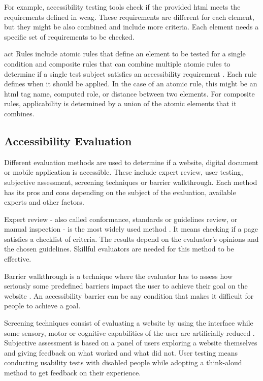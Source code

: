 \documentclass{master_thesis}
\begin{document}
For example, accessibility testing tools check if the provided \ac{html} meets the requirements defined in \ac{wcag}. These requirements are different for each element, but they might be also combined and include more criteria. Each element needs a specific set of requirements to be checked.

\ac{act} Rules include atomic rules that define an element to be tested for a single condition and composite rules that can combine multiple atomic rules to determine if a single test subject satisfies an accessibility requirement \citep{Fiers2019}. Each rule defines when it should be applied. In the case of an atomic rule, this might be an \ac{html} tag name, computed role, or distance between two elements. For composite rules, applicability is determined by a union of the atomic elements that it combines.

\subsection{Accessibility Evaluation}

Different evaluation methods are used to determine if a website, digital document or mobile application is accessible. These include expert review, user testing, subjective assessment, screening techniques or barrier walkthrough. Each method has its pros and cons depending on the subject of the evaluation, available experts and other factors.

Expert review - also called conformance, standards or guidelines review, or manual inspection - is the most widely used method \citep{Brajnik2008}. It means checking if a page satisfies a checklist of criteria. The results depend on the evaluator's opinions and the chosen guidelines. Skillful evaluators are needed for this method to be effective.

Barrier walkthrough is a technique where the evaluator has to assess how seriously some predefined barriers impact the user to achieve their goal on the website \citep{Brajnik2008}. An accessibility barrier can be any condition that makes it difficult for people to achieve a goal.

Screening techniques consist of evaluating a website by using the interface while some sensory, motor or cognitive capabilities of the user are artificially reduced \citep{Brajnik2008}. Subjective assessment is based on a panel of users exploring a website themselves and giving feedback on what worked and what did not. User testing means conducting usability tests with disabled people while adopting a think-aloud method to get feedback on their experience.
\end{document}
